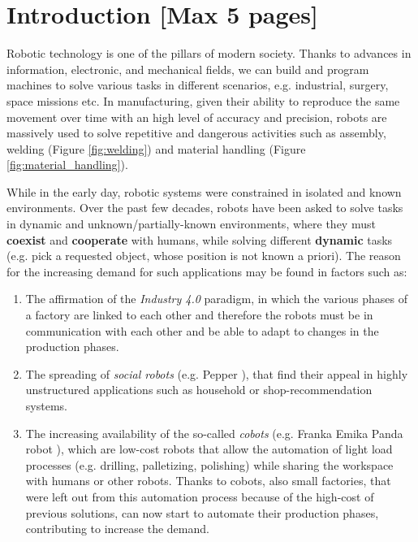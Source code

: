 \section{Introduction [Max 5 pages]}
\label{sec:intro}
Robotic technology is one of the pillars of modern society. Thanks to advances in information, electronic, and
mechanical fields, we can build and program machines to solve various tasks in different scenarios, e.g. industrial,
surgery, space missions etc. \newline In manufacturing, given their ability to reproduce the same movement over time
with an high level of accuracy and precision, robots are massively used to solve repetitive and dangerous activities
such as assembly, welding (Figure \ref{fig:welding}) and material handling    (Figure \ref{fig:material_handling}).

\noindent While in the early day, robotic systems were constrained in isolated and known environments. Over the past few
decades, robots have been asked to solve tasks in dynamic and unknown/partially-known environments, where they must
\textbf{coexist} and \textbf{cooperate} with humans, while  solving different \textbf{dynamic} tasks (e.g. pick a
requested object, whose position is not known a priori). \newline The reason for the increasing demand for such
applications may be found in factors such as:
\begin{enumerate}[label=(\alph*)]
    \item The affirmation of the \textit{Industry 4.0} paradigm, in which the various phases of a factory are linked to
    each other and therefore the robots must be in communication with each other and be able to adapt to changes in the
    production phases.
    \item The spreading of \textit{social robots} (e.g. Pepper \cite{pepper}), that find their appeal in highly
    unstructured applications such as household or shop-recommendation systems.      
    \item The increasing availability of the so-called \textit{cobots} (e.g. Franka Emika Panda robot \cite{panda}),
    which are low-cost robots that allow the automation of light load processes (e.g. drilling, palletizing, polishing)
    while sharing the workspace with humans or other robots. Thanks to cobots, also small factories, that were left out
    from this automation process because of the high-cost of previous solutions, can now start to automate their
    production phases, contributing to increase the demand.
\end{enumerate}
